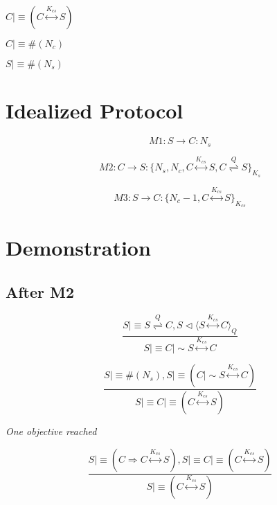 \noindent
$
C \mid\equiv ( C \stackrel{ K_{cs} }\longleftrightarrow S )
$

\noindent
$
C \mid\equiv \#( N_{c} )
$

\noindent
$
S \mid\equiv \#( N_{s} )
$

\section{Idealized Protocol}

\noindent
\begin{equation}
M1: S \rightarrow C:  N_{s}
\end{equation}


\noindent
\begin{equation}
M2: C \rightarrow S: \{ N_{s}, N_{c}, C \stackrel{ K_{cs} }\longleftrightarrow S, C \stackrel{ Q }\rightleftharpoons S  \}_{K_{s}}
\end{equation}
 
\begin{equation}
M3: S \rightarrow C: \{ N_{c} - 1, C \stackrel{ K_{cs} }\longleftrightarrow S \}_{K_{cs}}
\end{equation}

\section{Demonstration}

\subsection{After M2}
\begin{equation}
\frac{ 
	S \mid\equiv S \stackrel{ Q }\rightleftharpoons C, S \triangleleft  \langle S \stackrel {K_{cs}}\longleftrightarrow C \rangle_{ Q } 
 }
 {
	S \mid\equiv C \mid\sim S \stackrel {K_{cs}}\longleftrightarrow C
 }
\end{equation}

\begin{equation}
\frac{
	S \mid\equiv \#( N_{s} ), S \mid\equiv ( C \mid\sim S \stackrel {K_{cs}}\longleftrightarrow C )
}
{
 S \mid\equiv C \mid\equiv ( C \stackrel {K_{cs}}\longleftrightarrow S )
}
\end{equation}

\emph{One objective reached}

\begin{equation}
\frac{
	 S \mid\equiv (C \Rightarrow C \stackrel {K_{cs}}\longleftrightarrow S ), S \mid\equiv C \mid\equiv (C \stackrel {K_{cs}}\longleftrightarrow S)
}
{
	S \mid\equiv ( C \stackrel {K_{cs}}\longleftrightarrow S )
}
\end{equation}


